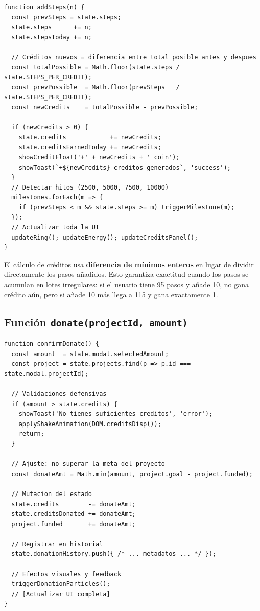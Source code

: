 \documentclass[12pt, a4paper]{article}
\begin{document}
\begin{lstlisting}[style=javascript, caption={Implementación de addSteps}]
function addSteps(n) {
  const prevSteps = state.steps;
  state.steps      += n;
  state.stepsToday += n;

  // Créditos nuevos = diferencia entre total posible antes y despues
  const totalPossible = Math.floor(state.steps / state.STEPS_PER_CREDIT);
  const prevPossible  = Math.floor(prevSteps   / state.STEPS_PER_CREDIT);
  const newCredits    = totalPossible - prevPossible;

  if (newCredits > 0) {
    state.credits            += newCredits;
    state.creditsEarnedToday += newCredits;
    showCreditFloat('+' + newCredits + ' coin');
    showToast(`+${newCredits} creditos generados`, 'success');
  }
  // Detectar hitos (2500, 5000, 7500, 10000)
  milestones.forEach(m => {
    if (prevSteps < m && state.steps >= m) triggerMilestone(m);
  });
  // Actualizar toda la UI
  updateRing(); updateEnergy(); updateCreditsPanel();
}
\end{lstlisting}

\begin{justificacionbox}
El cálculo de créditos usa \textbf{diferencia de mínimos enteros} en lugar de dividir directamente los pasos añadidos. Esto garantiza exactitud cuando los pasos se acumulan en lotes irregulares: si el usuario tiene 95 pasos y añade 10, no gana crédito aún, pero si añade 10 más llega a 115 y gana exactamente 1.
\end{justificacionbox}

\subsection{Función \texttt{donate(projectId, amount)}}

\begin{lstlisting}[style=javascript, caption={Lógica de donación}]
function confirmDonate() {
  const amount  = state.modal.selectedAmount;
  const project = state.projects.find(p => p.id === state.modal.projectId);

  // Validaciones defensivas
  if (amount > state.credits) {
    showToast('No tienes suficientes creditos', 'error');
    applyShakeAnimation(DOM.creditsDisp());
    return;
  }

  // Ajuste: no superar la meta del proyecto
  const donateAmt = Math.min(amount, project.goal - project.funded);

  // Mutacion del estado
  state.credits        -= donateAmt;
  state.creditsDonated += donateAmt;
  project.funded       += donateAmt;

  // Registrar en historial
  state.donationHistory.push({ /* ... metadatos ... */ });

  // Efectos visuales y feedback
  triggerDonationParticles();
  // [Actualizar UI completa]
}
\end{lstlisting}
\end{document}
